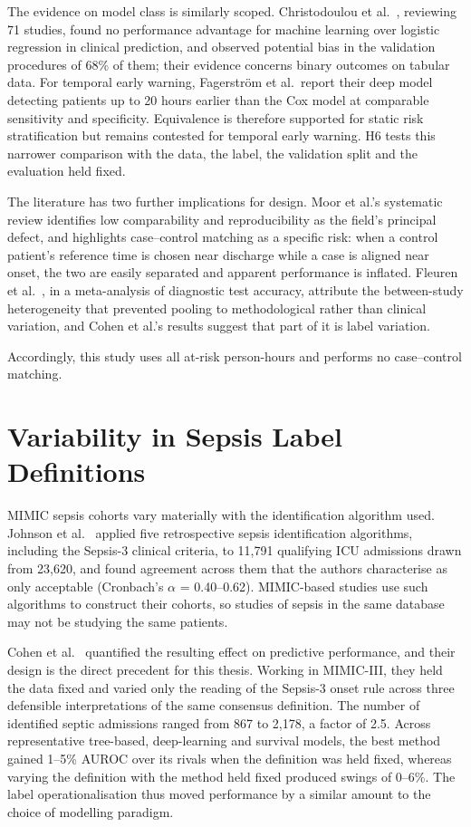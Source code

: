 The evidence on model class is similarly scoped. Christodoulou et al.\
\cite{christodoulou2019cox}, reviewing 71 studies, found no performance
advantage for machine learning over logistic regression in clinical
prediction, and observed potential bias in the validation procedures of 68\%
of them; their evidence concerns binary outcomes on tabular data. For temporal
early warning, Fagerstr{\"o}m et al.\ report their deep model detecting
patients up to 20 hours earlier than the Cox model at comparable sensitivity
and specificity. Equivalence is therefore supported for static risk
stratification but remains contested for temporal early warning. H6 tests this
narrower comparison with the data, the label, the validation split and the
evaluation held fixed.

The literature has two further implications for design. Moor et al.'s
systematic review \cite{moor2021review} identifies low comparability and
reproducibility as the field's principal defect, and highlights case--control
matching as a specific risk: when a control patient's reference time is chosen
near discharge while a case is aligned near onset, the two are easily
separated and apparent performance is inflated. Fleuren et al.\
\cite{fleuren2020ml}, in a meta-analysis of diagnostic test accuracy,
attribute the between-study heterogeneity that prevented pooling to
methodological rather than clinical variation, and Cohen et al.'s results
suggest that part of it is label variation.

Accordingly, this study uses all at-risk person-hours and performs no
case--control matching.


\section{Variability in Sepsis Label Definitions}
\label{sec:label_object}

MIMIC sepsis cohorts vary materially with the identification algorithm used.
Johnson et al.\ \cite{johnson2018comparative} applied five retrospective sepsis
identification algorithms, including the Sepsis-3 clinical criteria, to 11,791
qualifying ICU admissions drawn from 23,620, and found agreement across them
that the authors characterise as only acceptable (Cronbach's $\alpha$ =
0.40--0.62). MIMIC-based studies use such algorithms to construct their
cohorts, so studies of sepsis in the same database may not be studying the
same patients.

Cohen et al.\ \cite{cohen2024subtle} quantified the resulting effect on
predictive performance, and their design is the direct precedent for this
thesis. Working in MIMIC-III, they held the data fixed and varied only the
reading of the Sepsis-3 onset rule across three defensible interpretations of
the same consensus definition. The number of identified septic admissions
ranged from 867 to 2,178, a factor of 2.5. Across representative tree-based,
deep-learning and survival models, the best method gained 1--5\% AUROC over its
rivals when the definition was held fixed, whereas varying the definition with
the method held fixed produced swings of 0--6\%. The label operationalisation
thus moved performance by a similar amount to the choice of modelling
paradigm.


